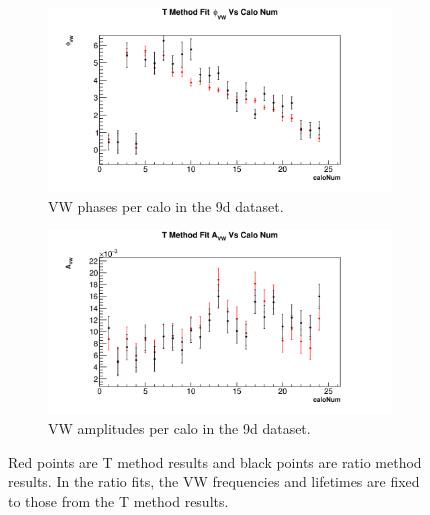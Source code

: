 \documentclass[12pt,letterpaper]{article}
\begin{document}
\begin{figure}[]
\centering
    \begin{subfigure}[]{0.46\textwidth}
        \centering
        \includegraphics[width=\textwidth]{9d-CaloFits-VW-Phases}
        \caption{VW phases per calo in the 9d dataset.}
    \end{subfigure}%
    \begin{subfigure}[]{0.46\textwidth}
        \centering
        \includegraphics[width=\textwidth]{9d-CaloFits-VW-Amps}
        \caption{VW amplitudes per calo in the 9d dataset.}
    \end{subfigure}
\caption[]{Red points are T method results and black points are ratio method results. In the ratio fits, the VW frequencies and lifetimes are fixed to those from the T method results.}
\label{fig:9d-PerCalo-VW}
\end{figure}
\end{document}

